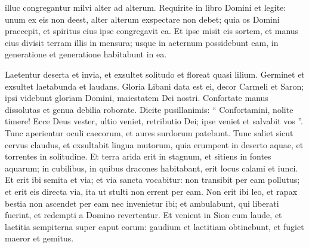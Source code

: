 \begin{biblechapter}
\begin{biblechapter}
\begin{biblechapter}
\begin{biblechapter}
\begin{biblechapter}
\begin{biblechapter}
\begin{biblechapter}
\begin{biblechapter}
\begin{biblechapter}
\begin{biblechapter}
\begin{biblechapter}
\begin{biblechapter}
\begin{biblechapter}
\begin{biblechapter}
\begin{biblechapter}
\begin{biblechapter}
\begin{biblechapter}
\begin{biblechapter}
\begin{biblechapter}
\begin{biblechapter}
\begin{biblechapter}
\begin{biblechapter}
\begin{biblechapter}
\begin{biblechapter}
\begin{biblechapter}
\begin{biblechapter}
\begin{biblechapter}
\begin{biblechapter}
\begin{biblechapter}
\begin{biblechapter}
\begin{biblechapter}
\begin{biblechapter}
\begin{biblechapter}
\begin{biblechapter}
 illuc congregantur milvi alter ad alterum.
 \verse Requirite in libro Domini et legite:
 unum ex eis non deest,
 alter alterum exspectare non debet;
 quia os Domini praecepit,
 et spiritus eius ipse congregavit ea. 
\verse Et ipse misit eis sortem,
 et manus eius divisit terram illis in mensura;
 usque in aeternum possidebunt eam,
 in generatione et generatione habitabunt in ea.
 
\begin{biblechapter}
\verse Laetentur deserta et invia,
 et exsultet solitudo et floreat quasi lilium.
 \verse Germinet et exsultet
 laetabunda et laudans.
 Gloria Libani data est ei,
 decor Carmeli et Saron;
 ipsi videbunt gloriam Domini,
 maiestatem Dei nostri.
 \verse Confortate manus dissolutas
 et genua debilia roborate.
 \verse Dicite pusillanimis:
 “ Confortamini, nolite timere!
 Ecce Deus vester,
 ultio veniet, retributio Dei;
 ipse veniet et salvabit vos ”.
 \verse Tunc aperientur oculi caecorum,
 et aures surdorum patebunt.
 \verse Tunc saliet sicut cervus claudus,
 et exsultabit lingua mutorum,
 quia erumpent in deserto aquae,
 et torrentes in solitudine.
 \verse Et terra arida erit in stagnum,
 et sitiens in fontes aquarum;
 in cubilibus, in quibus dracones habitabant,
 erit locus calami et iunci.
 \verse Et erit ibi semita et via;
 et via sancta vocabitur:
 non transibit per eam pollutus;
 et erit eis directa via,
 ita ut stulti non errent per eam.
 \verse Non erit ibi leo,
 et rapax bestia non ascendet per eam
 nec invenietur ibi;
 et ambulabunt, qui liberati fuerint,
 \verse et redempti a Domino revertentur.
 Et venient in Sion cum laude,
 et laetitia sempiterna super caput eorum:
 gaudium et laetitiam obtinebunt,
 et fugiet maeror et gemitus.
 

\end{biblechapter}
\end{biblechapter}
\end{biblechapter}
\end{biblechapter}
\end{biblechapter}
\end{biblechapter}
\end{biblechapter}
\end{biblechapter}
\end{biblechapter}
\end{biblechapter}
\end{biblechapter}
\end{biblechapter}
\end{biblechapter}
\end{biblechapter}
\end{biblechapter}
\end{biblechapter}
\end{biblechapter}
\end{biblechapter}
\end{biblechapter}
\end{biblechapter}
\end{biblechapter}
\end{biblechapter}
\end{biblechapter}
\end{biblechapter}
\end{biblechapter}
\end{biblechapter}
\end{biblechapter}
\end{biblechapter}
\end{biblechapter}
\end{biblechapter}
\end{biblechapter}
\end{biblechapter}
\end{biblechapter}
\end{biblechapter}
\end{biblechapter}
